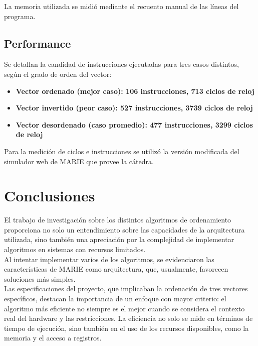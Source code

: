 \documentclass{sciposter}
\begin{document}
\begin{multicols*}{2}
La memoria utilizada se midió mediante el recuento manual de las líneas del programa.\\

\subsection{Performance}
Se detallan la candidad de instrucciones ejecutadas para tres casos distintos, según el grado de orden del vector:

\begin{itemize}
    \item \textbf{Vector ordenado (mejor caso): 106 instrucciones, 713 ciclos de reloj} 
    \item \textbf{Vector invertido (peor caso): 527 instrucciones, 3739
ciclos de reloj}
    \item \textbf{Vector desordenado (caso promedio): 477 instrucciones, 3299 ciclos de reloj}
\end{itemize}

Para la medición de ciclos e instrucciones se utilizó la versión modificada del simulador web de MARIE que provee la cátedra.

\section{Conclusiones}

El trabajo de investigación sobre los distintos algoritmos de ordenamiento proporciona no solo un entendimiento sobre las capacidades de la arquitectura utilizada, sino también una apreciación por la complejidad de implementar algoritmos en sistemas con recursos limitados.\\

Al intentar implementar varios de los algoritmos, se evidenciaron las características de MARIE como arquitectura, que, usualmente, favorecen soluciones más simples. \\

Las especificaciones del proyecto, que implicaban la ordenación de tres vectores específicos, destacan la importancia de un enfoque con mayor criterio: el algoritmo más eficiente no siempre es el mejor cuando se considera el contexto real del hardware y las restricciones. La eficiencia no solo se mide en términos de tiempo de ejecución, sino también en el uso de los recursos disponibles, como la memoria y el acceso a registros.

\end{multicols*}
\end{document}

